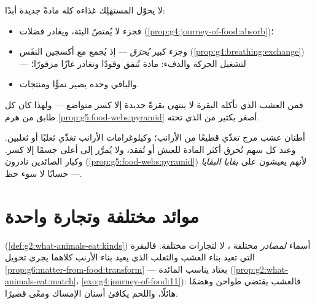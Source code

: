 \begin{proposition}\label{prop:g6:matter-from-food:losses}
لا يحوّل المستهلِك غذاءه كله مادةً جديدة أبدًا:
\begin{itemize}
  \item فجزء لا يُمتصّ البتة، ويغادر فضلات
        (\cref{prop:g4:journey-of-food:absorb})؛
  \item وجزء كبير \emph{يُحرَق} --- إذ يُجمع مع أكسجين النفَس
        (\cref{prop:g4:breathing:exchange}) --- لتشغيل الحركة
        والدفء: مادة تُنفق وقودًا وتغادر غازًا مزفورًا؛
  \item والباقي وحده يصير نموًّا ومنتجات.
\end{itemize}
فمن العشب الذي تأكله البقرة لا ينتهي بقرةً جديدة إلا كسر متواضع
--- ولهذا كان كل طابق من هرم
\cref{prop:g5:food-webs:pyramid} أصغر بكثير من الذي تحته.
\end{proposition}
\admitted

\begin{example}\label{ex:g6:matter-from-food:pyramid}
أطنان عشب مرج تغذّي قطيعًا من الأرانب؛ وكيلوغرامات الأرانب تغذّي
ثعلبًا أو ثعلبين. وعند كل سهم تُحرق أكثر المادة للعيش أو تُفقد،
ولا يُمرَّر إلى أعلى جسمًا إلا كسر. وكبار الصائدين نادرون
(\cref{prop:g5:food-webs:pyramid}) لأنهم يعيشون على
\emph{بقايا البقايا} --- حسابًا لا سوء حظ.
\end{example}

\section{موائد مختلفة وتجارة واحدة}

\begin{proposition}\label{prop:g6:matter-from-food:menus}
  
(\cref{def:g2:what-animals-eat:kinds}) أسماء \emph{لمصادر} مختلفة
، لا لتجارات مختلفة. فالبقرة التي تعيد بناء العشب
والثعلب الذي يعيد بناء الأرنب كلاهما يجري تحويل
\cref{prop:g6:matter-from-food:transform} --- بعتاد يناسب المائدة
(\cref{prop:g2:what-animals-eat:match}،
\cref{exo:g4:journey-of-food:11}): فالعشب يقتضي طواحن وهضمًا
هائلًا، واللحم يكافئ أسنان الإمساك ومعًى قصيرًا.
\end{proposition}
\admitted

